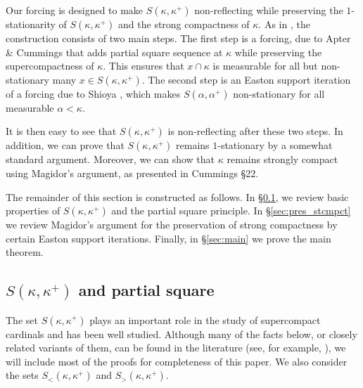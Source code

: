\documentclass[a4paper,12pt,reqno,oneside]{amsart}
\theoremstyle{plain}
\begin{document}
Our forcing is designed to make $S( \kappa , \kappa^+ )$ non-reflecting while preserving the $1$-stationarity of $S( \kappa , \kappa^+ )$ and the strong compactness of $\kappa$. As in \cite{Kr, S}, the construction consists of two main steps. The first step is a forcing, due to Apter \& Cummings \cite{AC} that adds partial square sequence at $\kappa$ while preserving the supercompactness of $\kappa$. This ensures that $x \cap \kappa$ is measurable for all but non-stationary many $x \in S( \kappa , \kappa^+ )$. The second step is an Easton support iteration of a forcing due to Shioya \cite{Sh}, which makes $S( \alpha , \alpha^+ )$ non-stationary for all measurable $\alpha < \kappa$.

It is then easy to see that $S( \kappa , \kappa^+ )$ is non-reflecting after these two steps. In addition, we can prove that $S( \kappa , \kappa^+ )$ remains $1$-stationary by a somewhat standard argument. Moreover, we can show that $\kappa$ remains strongly compact using Magidor's argument, as presented in Cummings \cite{C} \S 22.

The remainder of this section is constructed as follows. In \S \ref{sec:S_psquare}, we review basic properties of $S( \kappa , \kappa^+ )$ and the partial square principle. In \S \ref{sec:pres_stcmpct} we review Magidor's argument for the preservation of strong compactness by certain Easton support iterations. Finally, in \S \ref{sec:main} we prove the main theorem.


\subsection{$S(\kappa, \kappa^{+})$ and partial square} \label{sec:S_psquare}

The set $S( \kappa , \kappa^+ )$ plays an important role in the study of supercompact cardinals and has been well studied. Although many of the facts below, or closely related variants of them, can be found in the literature (see, for example, \cite{K,Je,Kr1,Kr2,S}), we will include most of the proofs for completeness of this paper. We also consider the sets $S_< ( \kappa , \kappa^+ )$ and $S_> ( \kappa , \kappa^+ )$.
\end{document}
